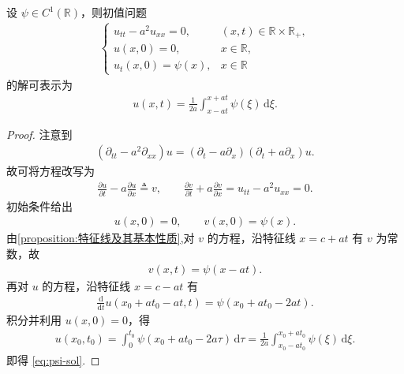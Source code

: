 \documentclass[../../main.tex]{subfiles}%
\begin{document}
\begin{proposition}\label{proposition:初值问题的解的表示}
设 $\psi\in C^1(\mathbb{R})$，则初值问题
\begin{align}
\begin{cases}
u_{tt}-a^2u_{xx}=0, & (x,t)\in\mathbb{R}\times\mathbb{R}_+, \\
u(x,0)=0, & x\in\mathbb{R}, \\
u_t(x,0)=\psi(x), & x\in\mathbb{R}
\end{cases} \label{eq:psi-problem}
\end{align}
的解可表示为
\begin{align}
u(x,t)=\frac{1}{2a}\int_{x-at}^{x+at}\psi(\xi)\,\mathrm{d}\xi. \label{eq:psi-sol}
\end{align}
\end{proposition}
\begin{proof}
注意到
\begin{align*}
\left( \partial _{tt}-a^2\partial _{xx} \right) u=\left( \partial _t-a\partial _x \right) \left( \partial _t+a\partial _x \right) u.
\end{align*}
故可将方程改写为
\begin{align*}
\frac{\partial u}{\partial t}-a\frac{\partial u}{\partial x}\triangleq v,\qquad
\frac{\partial v}{\partial t}+a\frac{\partial v}{\partial x}=u_{tt}-a^2u_{xx}=0.
\end{align*}
初始条件给出
\begin{align*}
u(x,0)=0,\qquad v(x,0)=\psi(x).
\end{align*}
由\cref{proposition:特征线及其基本性质},对 $v$ 的方程，沿特征线 $x=c+at$ 有 $v$ 为常数，故
\begin{align*}
v(x,t)=\psi(x-at).
\end{align*}
再对 $u$ 的方程，沿特征线 $x=c-at$ 有
\begin{align*}
\frac{\mathrm{d}}{\mathrm{d}t}u(x_0+at_0-at,t)=\psi(x_0+at_0-2at).
\end{align*}
积分并利用 $u(x,0)=0$，得
\begin{align*}
u(x_0,t_0)=\int_0^{t_0}\psi(x_0+at_0-2a\tau)\,\mathrm{d}\tau
=\frac{1}{2a}\int_{x_0-at_0}^{x_0+at_0}\psi(\xi)\,\mathrm{d}\xi.
\end{align*}
即得 \eqref{eq:psi-sol}.
\end{proof}
\end{document}
